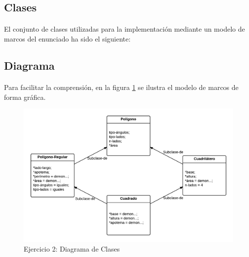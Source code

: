 \documentclass[10pt, a4paper,spanish]{article}
\begin{document}
    \subsection{Clases}

      \paragraph{}
      El conjunto de clases utilizadas para la implementación mediante un modelo de marcos del enunciado ha sido el siguiente:

			\begin{figure}[H]
				\centering
        
			\end{figure}

			\begin{figure}[H]
				\centering
        
			\end{figure}

			\begin{figure}[H]
				\centering
        
			\end{figure}

			\begin{figure}[H]
				\centering
        
			\end{figure}

    \subsection{Diagrama}

      \paragraph{}
      Para facilitar la comprensión, en la figura \ref{image:diagram-2} se ilustra el modelo de marcos de forma gráfica.

			\begin{figure}[H]
				\begin{center}
					\includegraphics[width=\textwidth]{exercise-2-diagram}
					\caption{Ejercicio 2: Diagrama de Clases}
					\label{image:diagram-2}
				\end{center}
			\end{figure}
\end{document}
